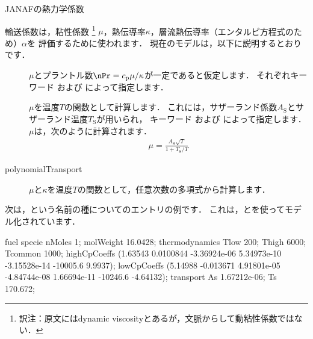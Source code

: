 \begin{table}[ht]
 
 \caption{JANAFの熱力学係数}
 \label{tbl:7.3}
\end{table}


輸送係数は，粘性係数%
\footnote{訳注：原文にはdynamic viscosityとあるが，文脈からして動粘性係数ではない．}%
$\mu$，熱伝導率$\kappa$，層流熱伝導率（エンタルピ方程式のため）$\alpha$を
評価するために使われます．
現在のモデルは，以下に説明するとおりです．
\begin{description}
 \item[]
            $\mu$とプラントル数$\nPr = c_{\mathrm{p}}\mu/\kappa$が一定であると仮定します．
            それぞれキーワード
%
%
            および
%
%
            によって指定します．
 \item[]
            $\mu$を温度$T$の関数として計算します．
            これには，サザーランド係数$A_{\mathrm{S}}$とサザーランド温度$T_{\mathrm{S}}$が用いられ，
            キーワード
%
%
            および
%
%
            によって指定します．
            $\mu$は，次のように計算されます．
\begin{align}
 \label{eq:7.2}
 \mu = \frac{A_{\mathrm{S}}\sqrt{T}}{1 + T_{\mathrm{S}}/T}
\end{align}
 \item[polynomialTransport]
            $\mu$と$\kappa$を温度$T$の関数として，任意次数の多項式から計算します．
\end{description}
次は，という名前の種についてのエントリの例です．
これは，とを使ってモデル化されています．
%
%
%
%
%
%
%
%
%
%
\begin{OFverbatim}[file]
fuel
{
    specie
    {
        nMoles       1;
        molWeight    16.0428;
    }
    thermodynamics
    {
        Tlow         200;
        Thigh        6000;
        Tcommon      1000;
        highCpCoeffs (1.63543 0.0100844 -3.36924e-06 5.34973e-10
                      -3.15528e-14 -10005.6 9.9937);
        lowCpCoeffs  (5.14988 -0.013671 4.91801e-05 -4.84744e-08
                      1.66694e-11 -10246.6 -4.64132);
    }
    transport
    {
        As           1.67212e-06;
        Ts           170.672;
    }
}
\end{OFverbatim}
